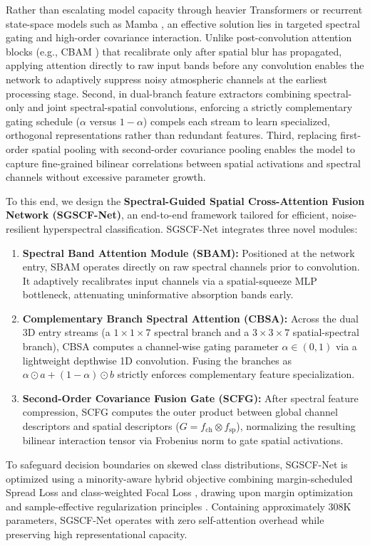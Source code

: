 \documentclass[manuscript,screen,review]{acmart}
\begin{document}
Rather than escalating model capacity through heavier Transformers or recurrent state-space models such as Mamba \cite{gu2023mamba}, an effective solution lies in targeted spectral gating and high-order covariance interaction. Unlike post-convolution attention blocks (e.g., CBAM \cite{woo2018cbam}) that recalibrate only after spatial blur has propagated, applying attention directly to raw input bands before any convolution enables the network to adaptively suppress noisy atmospheric channels at the earliest processing stage. Second, in dual-branch feature extractors combining spectral-only and joint spectral-spatial convolutions, enforcing a strictly complementary gating schedule ($\alpha$ versus $1-\alpha$) compels each stream to learn specialized, orthogonal representations rather than redundant features. Third, replacing first-order spatial pooling with second-order covariance pooling enables the model to capture fine-grained bilinear correlations between spatial activations and spectral channels without excessive parameter growth.

To this end, we design the \textbf{Spectral-Guided Spatial Cross-Attention Fusion Network (SGSCF-Net)}, an end-to-end framework tailored for efficient, noise-resilient hyperspectral classification. SGSCF-Net integrates three novel modules:
\begin{enumerate}
    \item \textbf{Spectral Band Attention Module (SBAM):} Positioned at the network entry, SBAM operates directly on raw spectral channels prior to convolution. It adaptively recalibrates input channels via a spatial-squeeze MLP bottleneck, attenuating uninformative absorption bands early.
    \item \textbf{Complementary Branch Spectral Attention (CBSA):} Across the dual 3D entry streams (a $1\times 1\times 7$ spectral branch and a $3\times 3\times 7$ spatial-spectral branch), CBSA computes a channel-wise gating parameter $\alpha \in (0, 1)$ via a lightweight depthwise 1D convolution. Fusing the branches as $\alpha \odot a + (1-\alpha) \odot b$ strictly enforces complementary feature specialization.
    \item \textbf{Second-Order Covariance Fusion Gate (SCFG):} After spectral feature compression, SCFG computes the outer product between global channel descriptors and spatial descriptors ($G = f_{\text{ch}} \otimes f_{\text{sp}}$), normalizing the resulting bilinear interaction tensor via Frobenius norm to gate spatial activations.
\end{enumerate}
To safeguard decision boundaries on skewed class distributions, SGSCF-Net is optimized using a minority-aware hybrid objective combining margin-scheduled Spread Loss \cite{sabour2018matrix} and class-weighted Focal Loss \cite{lin2017focal}, drawing upon margin optimization and sample-effective regularization principles \cite{cao2019learning, haut2021generative}. Containing approximately 308K parameters, SGSCF-Net operates with zero self-attention overhead while preserving high representational capacity.
\end{document}
